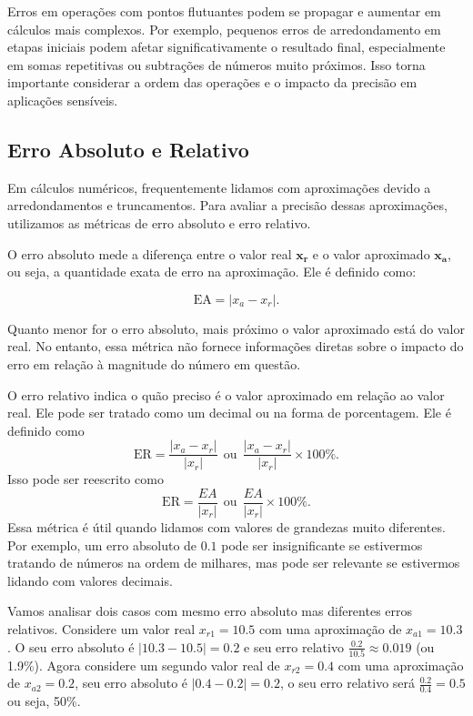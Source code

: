 Erros em operações com pontos flutuantes podem se propagar e aumentar em cálculos mais complexos. Por exemplo, pequenos erros de arredondamento em etapas iniciais podem afetar significativamente o resultado final, especialmente em somas repetitivas ou subtrações de números muito próximos. Isso torna importante considerar a ordem das operações e o impacto da precisão em aplicações sensíveis.

\subsection{Erro Absoluto e Relativo}

Em cálculos numéricos, frequentemente lidamos com aproximações devido a arredondamentos e truncamentos. Para avaliar a precisão dessas aproximações, utilizamos as métricas de erro absoluto e erro relativo.
  
O erro absoluto mede a diferença entre o valor real \(\boldsymbol{x_r}\) e o valor aproximado \(\boldsymbol{x_a}\), ou seja, a quantidade exata de erro na aproximação. Ele é definido como:

\begin{equation}
\text{EA} = |x_a - x_r|.
\end{equation}

Quanto menor for o erro absoluto, mais próximo o valor aproximado está do valor real. No entanto, essa métrica não fornece informações diretas sobre o impacto do erro em relação à magnitude do número em questão.  

O erro relativo indica o quão preciso é o valor aproximado em relação ao valor real. Ele pode ser tratado como um decimal ou na forma de porcentagem. Ele é definido como
\begin{equation}
\text{ER} = \frac{|x_a - x_r|}{|x_r|}\ \ \textrm{ou}\ \ \frac{|x_a - x_r|}{|x_r|}\times 100\%.
\end{equation}
Isso pode ser reescrito como
\begin{equation}
\text{ER} = \frac{{EA}}{|x_r|}\ \ \textrm{ou}\ \ \frac{{EA}}{|x_r|}\times 100\%.
\end{equation}
Essa métrica é útil quando lidamos com valores de grandezas muito diferentes. Por exemplo, um erro absoluto de \( 0.1 \) pode ser insignificante se estivermos tratando de números na ordem de milhares, mas pode ser relevante se estivermos lidando com valores decimais. 

Vamos analisar dois casos com mesmo erro absoluto mas diferentes erros relativos. Considere um valor real \( x_{r1} = 10.5 \) com uma aproximação de \( x_{a1} = 10.3 \). O seu erro absoluto é \(|10.3 - 10.5| = 0.2\) e seu erro relativo \(\frac{0.2}{10.5} \approx 0.019\) (ou 1.9\%). Agora considere um segundo valor real de \(x_{r2} =  0.4 \) com uma aproximação de \(x_{a2} = 0.2 \), seu erro absoluto é \(|0.4 - 0.2| = 0.2\), o seu erro relativo será \(\frac{0.2}{0.4} = 0.5\) ou seja, 50\%.

